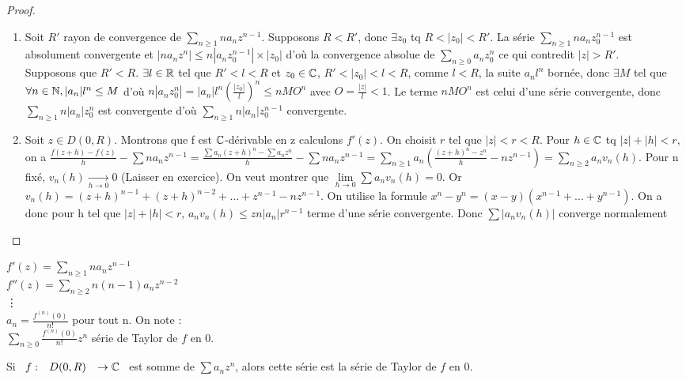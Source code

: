 \documentclass[]{report}
\begin{document}
\begin{proof}{}{}
    \begin{enumerate}
        \item Soit $R'$ rayon de convergence de $\sum_{n\ge1}na_nz^{n-1}$. Supposons $R<R'$, donc $\exists z_0$ tq $R<|z_0|<R'$. La série $\sum_{n\ge1}na_nz_0^{n-1}$ est absolument convergente et $|na_nz^{n}|\le n|a_nz_0^{n-1}|\times |z_0|$ d'où la convergence absolue de $\sum_{n\ge0}a_nz_0^{n}$ ce qui contredit $|z|>R'$.\\
        Supposons que $R'<R$. $\exists l\in\mathbb{R} $ tel que $R'<l<R$ et $z_0\in\mathbb{C}$, $R'<|z_0|<l<R$, comme $l<R$, la suite $a_nl^n$ bornée, donc $\exists M$ tel que $\forall n \in \mathbb{N},|a_n|l^n \le M$ d'où $n|a_nz_0^n|=|a_n|l^n(\frac{|z_0|}{l})^n\le nMO^n$ avec $O=\frac{|z|}{l}<1$. Le terme $nMO^n$ est celui d'une série convergente, donc $\sum_{n\ge1}n|a_n|z_0^{n}$ est convergente d'où $\sum_{n\ge1}n|a_n|z_0^{n-1}$ convergente.
        \item Soit $z\in D(0,R)$. Montrons que f est $\mathbb{C}$-dérivable en z calculons $f'(z)$. On choisit $r$ tel que $|z|<r<R$. Pour $h\in\mathbb{C}$ tq $|z|+|h|<r$, on a $\frac{f(z+h)-f(z)}{h}-\sum na_nz^{n-1}=\frac{\sum a_n (z+h)^n-\sum a_nz^n}{h}-\sum na_nz^{n-1}=\sum_{n\ge1}a_n(\frac{(z+h)^n-z^n}{h}-nz^{n-1})=\sum_{n\ge2}a_nv_n(h)$. Pour n fixé, $v_n(h) \underset{h\to 0}{\longrightarrow} 0 $ (Laisser en exercice). On veut montrer que $\lim\limits_{h \rightarrow 0} \sum a_nv_n(h)=0$. Or $v_n(h)=(z+h)^{n-1}+(z+h)^{n-2}+\ldots+z^{n-1}-nz^{n-1}$. On utilise la formule $x^n-y^n=(x-y)(x^{n-1}+\ldots+y^{n-1})$. On a donc pour h tel que $|z|+|h|<r$, $a_nv_n(h)\le zn|a_n|r^{n-1}$ terme d'une série convergente. Donc $\sum|a_nv_n(h)|$ converge normalement
    \end{enumerate}
\end{proof}

\begin{re}{}{}
    $f'(z)=\sum_{n\ge1}na_nz^{n-1}$\\
    $f''(z)=\sum_{n\ge2}n(n-1)a_nz^{n-2}$\\
    \vdots \\
    $a_n=\frac{f^{(n)}(0)}{n!}$ pour tout n. On note :\\
    $\sum_{n\ge0}\frac{f^{(n)}(0)}{n!}z^n$ série de Taylor de $f$ en 0.
\end{re}

\begin{cor}{}{}
    Si $\begin{array}{ccccc} f : & D(0,R) & \to  \mathbb{C}\end{array}$ est somme de $\sum a_n z^n$, alors cette série est la série de Taylor de $f$ en 0.
\end{cor}
\end{document}
